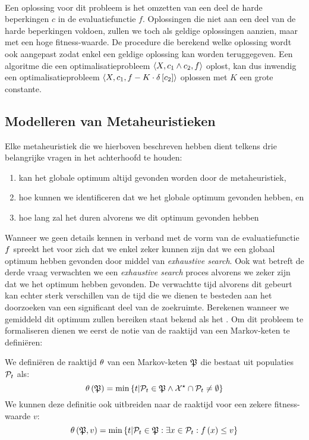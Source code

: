 \paragraph{}
Een oplossing voor dit probleem is het omzetten van een deel de harde beperkingen $c$ in de evaluatiefunctie $f$. Oplossingen die niet aan een deel van de harde beperkingen voldoen, zullen we toch als geldige oplossingen aanzien, maar met een hoge fitness-waarde. De procedure die berekend welke oplossing wordt ook aangepast zodat enkel een geldige oplossing kan worden teruggegeven. Een algoritme die een optimalisatieprobleem $\left\langle X,c_1\wedge c_2,f\right\rangle$ oplost, kan dus inwendig een optimalisatieprobleem $\left\langle X,c_1,f-K\cdot\delta\left[c_2\right]\right\rangle$ oplossen met $K$ een grote constante.

\subsection{Modelleren van Metaheuristieken}

Elke metaheuristiek die we hierboven beschreven hebben dient telkens drie belangrijke vragen in het achterhoofd te houden\cite{DBLP:journals/jc/ShonkwilerV94}:
\begin{enumerate}
 \item kan het globale optimum altijd gevonden worden door de metaheuristiek,
 \item hoe kunnen we identificeren dat we het globale optimum gevonden hebben, en
 \item hoe lang zal het duren alvorens we dit optimum gevonden hebben
\end{enumerate}

Wanneer we geen details kennen in verband met de vorm van de evaluatiefunctie $f$ spreekt het voor zich dat we enkel zeker kunnen zijn dat we een globaal optimum hebben gevonden door middel van \emph{exhaustive search}. Ook wat betreft de derde vraag verwachten we een \emph{exhaustive search} proces alvorens we zeker zijn dat we het optimum hebben gevonden. De verwachtte tijd alvorens dit gebeurt kan echter sterk verschillen van de tijd die we dienen te besteden aan het doorzoeken van een significant deel van de zoekruimte. Berekenen wanneer we gemiddeld dit optimum zullen bereiken staat bekend als het . Om dit probleem te formaliseren dienen we eerst de notie van de raaktijd van een Markov-keten te defini\"eren:

\begin{definition}
We defini\"eren de raaktijd $\theta$ van een Markov-keten $\mathfrak{P}$ die bestaat uit populaties $\mathcal{P}_t$ als:
\begin{equation}
\theta\left(\mathfrak{P}\right)=\min\left\{ t|\mathcal{P}_t\in\mathfrak{P}\wedge\mathcal{X}^{\star}\cap \mathcal{P}_t\neq\emptyset\right\}
\end{equation}
We kunnen deze definitie ook uitbreiden naar de raaktijd voor een zekere fitness-waarde $v$:
\begin{equation}
\theta\left(\mathfrak{P},v\right)=\min\left\{ t|\mathcal{P}_t\in\mathfrak{P}:\exists x\in \mathcal{P}_t:f\left(x\right)\leq v\right\}
\end{equation}
\end{definition}

